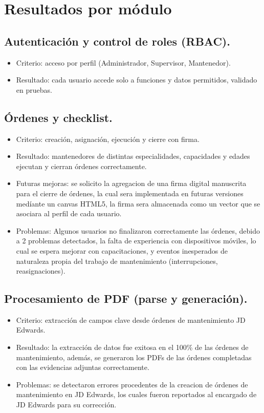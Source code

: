 \documentclass[10pt,a4paper]{report}
\begin{document}
\section*{Resultados por m\'odulo}
\subsection*{Autenticaci\'on y control de roles (RBAC).}
\begin{itemize}
    \item Criterio: acceso por perfil (Administrador, Supervisor, Mantenedor).
    \item Resultado: cada usuario accede solo a funciones y datos permitidos, validado en pruebas.
\end{itemize}

\subsection*{Órdenes y checklist.}
\begin{itemize}
    \item Criterio: creaci\'on, asignaci\'on, ejecuci\'on y cierre con firma.
    \item Resultado: mantenedores de distintas especialidades, capacidades y edades ejecutan y cierran órdenes correctamente.
    \item Futuras mejoras: se solicito la agregacion de una firma digital manuscrita para el cierre de órdenes, la cual sera implementada en futuras versiones medíante un canvas HTML5, la firma sera almacenada como un vector que se asociara al perfil de cada usuario.
    \item Problemas: Algunos usuarios no finalizaron correctamente las órdenes, debido a 2 problemas detectados, la falta de experiencia con dispositivos m\'oviles, lo cual se espera mejorar con capacitaciones, y eventos inesperados de naturaleza propia del trabajo de mantenimiento (interrupciones, reasignaciones).
\end{itemize}

\subsection*{Procesamiento de PDF (parse y generaci\'on).}
\begin{itemize}
    \item Criterio: extracci\'on de campos clave desde órdenes de mantenimiento JD Edwards.
    \item Resultado: la extracci\'on de datos fue exitosa en el 100\% de las órdenes de mantenimiento, adem\'as, se generaron los PDFs de las órdenes completadas con las evidencias adjuntas correctamente.
    \item Problemas: se detectaron errores procedentes de la creacion de órdenes de mantenimiento en JD Edwards, los cuales fueron reportados al encargado de JD Edwards para su correcci\'on.
\end{itemize}
\end{document}
